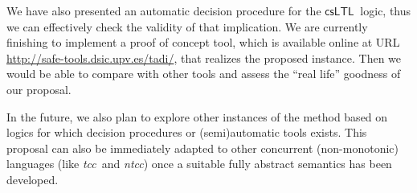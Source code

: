 \documentclass[american]{new_tlp}
\newcommand*{\csltl}[1][]{\ensuremath{\textsf{csLTL}_{#1}}}
\newcommand*{\ntcc}{\textit{ntcc}}
\newcommand*{\tcc}{\textit{tcc}}
\begin{document}
We have also presented an automatic decision procedure for the \csltl\
logic, thus we can effectively check the validity of that implication.  We
are currently finishing to implement a proof of concept tool, which is
available online at URL \url{http://safe-tools.dsic.upv.es/tadi/}, that
realizes the proposed instance.  Then we would be able to compare with
other tools and assess the ``real life'' goodness of our proposal.

In the future, we also plan to explore other instances of the method based
on logics for which decision procedures or (semi)automatic tools exists.
This proposal can also be immediately adapted to other concurrent
(non-monotonic) languages (like \tcc\ and \ntcc) once a suitable fully
abstract semantics has been developed.



\end{document}
